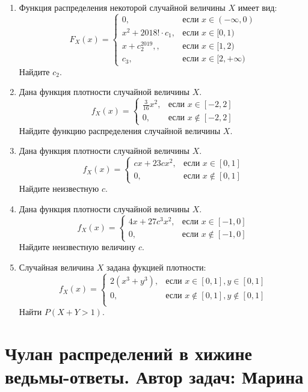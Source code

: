 \documentclass[a4paper,12pt]{article}
\begin{document}
\begin{enumerate} %
\item %
Функция распределения некоторой случайной величины $X$ имеет вид:
\[
F_X(x) =
\begin{cases}
0,&\text{если } x\in(-\infty , 0) \\
x^2 + 2018! \cdot c_1,&\text{если } x\in[0, 1) \\
x + c_2^{2019}, ,&\text{если } x\in[1, 2) \\
c_3, &\text{если } x\in[2, +\infty)
\end{cases}
\]
Найдите $c_2$.
\item %
Дана функция плотности случайной величины $X$.
\[
f_X(x) =
\begin{cases}
\frac{3}{16}x^2,&\text{если } x\in[-2, 2] \\
0,&\text{если } x\notin[-2, 2]
\end{cases}
\]
Найдите функцию распределения случайной величины $X$.
\item %
Дана функция плотности случайной величины $X$.
\[
f_X(x) =
\begin{cases}
cx+23cx^2,&\text{если } x\in[0, 1] \\
0,&\text{если } x\notin[0, 1]
\end{cases}
\]
Найдите неизвестную $c$.
\item %
Дана функция плотности случайной величины $X$.
\[
f_X(x) =
\begin{cases}
4x + 27c^3x^2,&\text{если } x\in[-1, 0] \\
0,&\text{если } x\notin[-1, 0]
\end{cases}
\]
Найдите неизвестную величину $c$.
\item %
Случайная величина $X$ задана фукцией плотности:
\[
f_X(x) =
\begin{cases}
2(x^3+y^3),&\text{если } x\in[0, 1], y\in[0, 1] \\
0,&\text{если } x\notin[0, 1], y\notin[0, 1] \\
\end{cases}
\]
Найти $P(X + Y > 1)$.
\end{enumerate}

\newpage
\section{Чулан распределений в хижине ведьмы-ответы. Автор задач: Марина}
\end{document}
